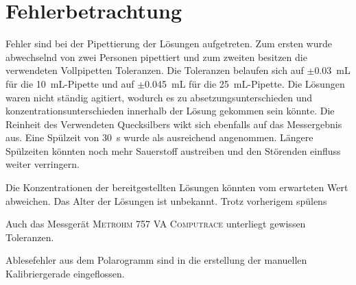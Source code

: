 \section{Fehlerbetrachtung}
\label{sec:fehler}

Fehler sind bei der Pipettierung der Lösungen aufgetreten. Zum ersten wurde abwechselnd von zwei Personen pipettiert und zum zweiten besitzen die verwendeten Vollpipetten Toleranzen. Die Toleranzen belaufen sich auf $\pm$\SI{0,03}{\milli\liter} für die \SI{10}{\milli\liter}-Pipette und auf $\pm$\SI{0,045}{\milli\liter} für die \SI{25}{\milli\liter}-Pipette. Die Lösungen waren nicht ständig agitiert, wodurch es zu absetzungsunterschieden und konzentrationsunterschieden innerhalb der Lösung gekommen sein könnte. Die Reinheit des Verwendeten Quecksilbers wikt sich ebenfalls auf das Messergebnis aus. Eine Spülzeit von \SI{30}{\second} wurde als ausreichend angenommen. Längere Spülzeiten könnten noch mehr Sauerstoff austreiben und den Störenden einfluss weiter verringern.

Die Konzentrationen der bereitgestellten Lösungen könnten vom erwarteten Wert abweichen. Das Alter der Lösungen ist unbekannt. Trotz vorherigem spülens

Auch das Messgerät \textsc{Metrohm 757 VA Computrace} unterliegt gewissen Toleranzen.

Ablesefehler aus dem Polarogramm sind in die erstellung der manuellen Kalibriergerade eingeflossen.